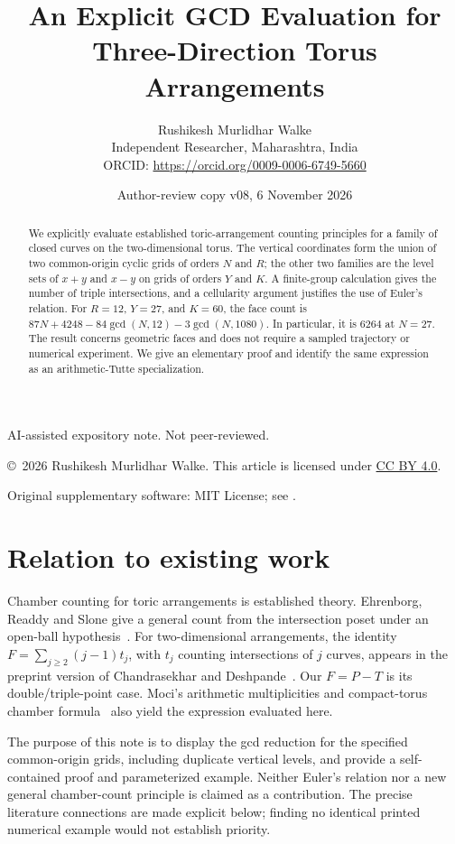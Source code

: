 \documentclass[a4paper,11pt]{article}
\title{An Explicit GCD Evaluation for Three-Direction Torus Arrangements}
\author{Rushikesh Murlidhar Walke\\
\small Independent Researcher, Maharashtra, India\\
\small ORCID: \url{https://orcid.org/0009-0006-6749-5660}}
\date{Author-review copy v08, 6 November 2026}
\begin{document}
\maketitle

\begin{center}
\small AI-assisted expository note. Not peer-reviewed.
\par\smallskip
\footnotesize \copyright\ 2026 Rushikesh Murlidhar Walke.
This article is licensed under
\href{https://creativecommons.org/licenses/by/4.0/}{CC BY 4.0}.
\par Original supplementary software: MIT License; see .
\end{center}

\begin{abstract}
We explicitly evaluate established toric-arrangement counting principles
for a family of closed curves on the two-dimensional torus. The vertical
coordinates form the union of two common-origin cyclic grids of orders
$N$ and $R$; the other two families are the level sets of $x+y$ and $x-y$
on grids of orders $Y$ and $K$. A finite-group calculation gives the number
of triple intersections, and a cellularity argument justifies the use of
Euler's relation. For $R=12$, $Y=27$, and $K=60$, the face count is
$87N+4248-84\gcd(N,12)-3\gcd(N,1080)$. In particular, it is $6264$ at
$N=27$. The result concerns geometric faces and does not require a sampled
trajectory or numerical experiment. We give an elementary proof and
identify the same expression as an arithmetic-Tutte specialization.
\end{abstract}

\section{Relation to existing work}
Chamber counting for toric arrangements is established theory.
Ehrenborg, Readdy and Slone give a general count from the intersection
poset under an open-ball hypothesis~\cite[Theorem 3.6]{ERS}.
For two-dimensional arrangements, the identity
$F=\sum_{j\geq2}(j-1)t_j$, with $t_j$ counting intersections of $j$ curves,
appears in the preprint version of Chandrasekhar and
Deshpande~\cite[Lemma 2.4]{CD}. Our $F=P-T$ is its double/triple-point case.
Moci's arithmetic multiplicities and compact-torus chamber
formula~\cite[Section 2.2, Lemma 5.4 and Corollary 5.16]{Moci}
also yield the expression evaluated here.

The purpose of this note is to display the gcd reduction for the specified
common-origin grids, including duplicate vertical levels, and provide a
self-contained proof and parameterized example. Neither Euler's relation
nor a new general chamber-count principle is claimed as a contribution.
The precise literature connections are made explicit below; finding no
identical printed numerical example would not establish priority.
\end{document}
